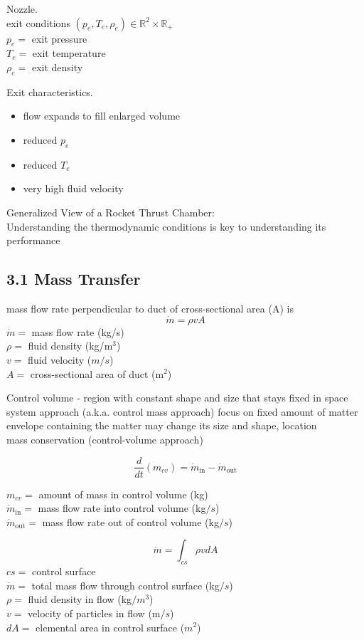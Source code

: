 \documentclass[10pt]{amsart}
\begin{document}
\begin{multicols*}{2}
Nozzle. \\
exit conditions
$(p_e, T_e, \rho_e) \in \mathbb{R}^2 \times \mathbb{R}_+$ \\
$p_e = $ exit pressure \\
$T_e = $ exit temperature \\
$\rho_e = $ exit density 

Exit characteristics. 
\begin{itemize}
	\item flow expands to fill enlarged volume 
	\item reduced $p_e$ 
	\item reduced $T_e$
	\item very high fluid velocity 
\end{itemize}
Generalized View of a Rocket Thrust Chamber: \\
Understanding the thermodynamic conditions is key to understanding its performance

\subsection{3.1 Mass Transfer}

mass flow rate perpendicular to duct of cross-sectional area (A) is 
\[
\dot{m} = \rho v A
\]
$\dot{m} = $ mass flow rate (kg/s) \\
$\rho =$ fluid density (kg/$\text{m}^3$) \\
$v = $ fluid velocity ($m/s$) \\
$A = $ cross-sectional area of duct ($\text{m}^2$)

Control volume - region with constant shape and size that stays fixed in space \\
system approach (a.k.a. control mass approach) focus on fixed amount of matter \\
envelope containing the matter may change its size and shape, location \\
mass conservation (control-volume approach)

\[
\frac{d}{dt} (m_{cv}) = \dot{m}_{\text{in}} - \dot{m}_{\text{out}}
\]

$m_{cv} = $ amount of mass in control volume (kg) \\
$\dot{m}_{\text{in}} = $ mass flow rate into control volume (kg$/s$) \\
$\dot{m}_{\text{out}} = $ mass flow rate out of control volume (kg$/s$)

\[
\dot{m}= \int_{cs} \rho v dA
\]
$cs  = $ control surface \\
$\dot{m} = $ total mass flow through control surface (kg$/s$) \\
$\rho = $ fluid density in flow (kg$/m^3$) \\
$v = $ velocity of particles in flow (m$/s$)  \\
$dA = $ elemental area in control surface ($m^2$)




\end{multicols*}
\end{document}
